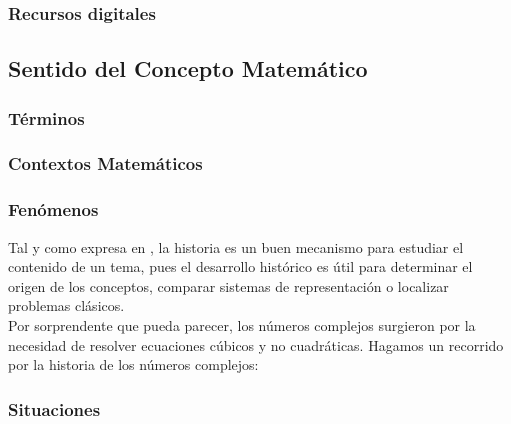 \documentclass[../main.tex]{memoir}
\begin{document}
\subsubsection{Recursos digitales}

\subsection{Sentido del Concepto Matemático}

\subsubsection{Términos}


\subsubsection{Contextos Matemáticos}

\subsubsection{Fenómenos}

Tal y como expresa \cite{lupi2013} en \cite{rico2013}, la historia es un buen mecanismo para estudiar el contenido de un tema, pues el desarrollo histórico es útil para determinar el origen de los conceptos, comparar sistemas de representación o localizar problemas clásicos. \\

Por sorprendente que pueda parecer, los números complejos surgieron por la necesidad de resolver ecuaciones cúbicos y no cuadráticas. Hagamos un recorrido por la historia de los números complejos:




\subsubsection{Situaciones}
\end{document}
